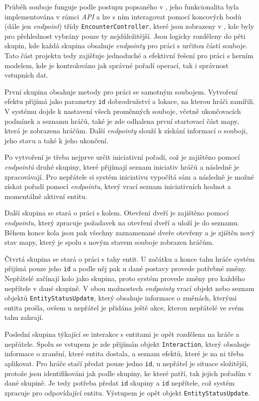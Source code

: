 Průběh souboje funguje podle postupu popsaného v , jeho funkcionalita byla implementována v rámci \textit{API} a lze s ním interagovat pomocí koncových bodů (dále jen \textit{endpoint}) třídy \texttt{EncounterController}, které jsou zobrazeny v , kde byly pro přehlednost vybrány pouze ty nejdůležitější. Jsou logicky rozděleny do pěti skupin, kde každá skupina obsahuje \textit{endpointy} pro práci s určitou částí souboje. Tato část projektu tedy zajišťuje jednoduché a efektivní řešení pro práci s herním modelem, kde je kontrolováno jak správné pořadí operací, tak i správnost vstupních dat.



První skupina obsahuje metody pro práci se samotným soubojem. Vytvoření efektu přijímá jako parametry \texttt{id} dobrodružství a lokace, na kterou hráči zamířili. V systému dojde k nastavení všech proměnných souboje, včetně ukončovacích podmínek a seznamu hráčů, také je zde odhalena první startovací část mapy, která je zobrazena hráčům. Další \textit{endpointy} slouží k získání informací o souboji, jeho stavu a také k jeho ukončení.

Po vytvoření je třeba nejprve určit iniciativní pořadí, což je zajištěno pomocí \textit{endpointů} druhé skupiny, které přijímají seznam iniciativ hráčů a následně je zpracovávají. Pro nepřátele si systém iniciativu vypočítá sám a následně je možné získat pořadí pomocí \textit{endpointu}, který vrací seznam iniciativních hodnot a momentálně aktivní entitu.

Další skupina se stará o práci s kolem. Otevření dveří je zajištěno pomocí \textit{endpointu}, který zpracuje požadavek na otevření dveří a uloží je do seznamu. Během konce kola jsou pak všechny zaznamenané dveře otevřeny a je zjištěn nový stav mapy, který je spolu s novým stavem souboje zobrazen hráčům.

Čtvrtá skupina se stará o práci s tahy entit. U začátku a konce tahu hráče systém přijímá pouze jeho \texttt{id} a podle něj pak u dané postavy provede potřebné změny. Nepřátelé začínají kolo jako skupina, proto systém provede změny pro každého nepřítele v dané skupině. V obou možnostech \textit{endpointy} vrací objekt nebo seznam objektů \texttt{EntityStatusUpdate}, který obsahuje informace o změnách, kterými entita prošla, ovšem u nepřátel je přidána ještě akce, kterou nepřátelé ve svém tahu zahrají.

Poslední skupina týkající se interakce s entitami je opět rozdělena na hráče a nepřátele. Spolu se vstupem je zde přijímán objekt \texttt{Interaction}, který obsahuje informace o zranění, které entita dostala, a seznam efektů, které je na ni třeba aplikovat. Pro hráče stačí předat pouze jedno \texttt{id}, u nepřátel je situace složitější, protože jsou identifikováni jak podle skupiny, ke které patří, tak jejich pořadím v dané skupině. Je tedy potřeba předat \texttt{id} skupiny a \texttt{id} nepřítele, což systém zpracuje pro odpovídající entitu. Výstupem je opět objekt \texttt{EntityStatusUpdate}.

